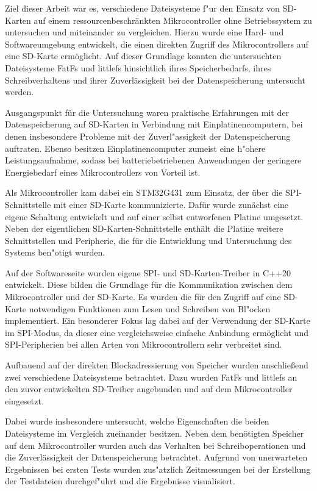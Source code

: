 \documentclass[11pt]{article}
\begin{document}
Ziel dieser Arbeit war es, verschiedene Dateisysteme f"ur den Einsatz 
von SD-Karten auf einem ressourcenbeschränkten Mikrocontroller ohne Betriebssystem zu untersuchen 
und miteinander zu vergleichen. 
Hierzu wurde eine Hard- und Softwareumgebung entwickelt, 
die einen direkten Zugriff des Mikrocontrollers auf eine SD-Karte ermöglicht. 
Auf dieser Grundlage konnten die untersuchten Dateisysteme FatFs und littlefs hinsichtlich ihres Speicherbedarfs, 
ihres Schreibverhaltens und ihrer Zuverlässigkeit bei der Datenspeicherung untersucht werden.

Ausgangspunkt für die Untersuchung waren praktische Erfahrungen mit der Datenspeicherung
auf SD-Karten in Verbindung mit Einplatinencomputern, 
bei denen insbesondere Probleme mit der Zuverl"assigkeit der Datenspeicherung auftraten.
Ebenso besitzen Einplatinencomputer zumeist eine h"ohere Leistungsaufnahme,
sodass bei batteriebetriebenen Anwendungen der geringere Energiebedarf 
eines Mikrocontrollers von Vorteil ist.

Als Mikrocontroller kam dabei ein STM32G431 zum Einsatz, der über die SPI-Schnittstelle mit einer SD-Karte kommunizierte.
Dafür wurde zunächst eine eigene Schaltung entwickelt und auf einer selbst entworfenen Platine umgesetzt.
Neben der eigentlichen SD-Karten-Schnittstelle enthält die Platine weitere Schnittstellen und Peripherie,
die für die Entwicklung und Untersuchung des Systems ben"otigt wurden.

Auf der Softwareseite wurden eigene SPI- und SD-Karten-Treiber in C++20 entwickelt. 
Diese bilden die Grundlage für die Kommunikation zwischen dem Mikrocontroller und der SD-Karte.
Es wurden die für den Zugriff auf eine SD-Karte notwendigen Funktionen zum Lesen und Schreiben
von Bl"ocken implementiert. 
Ein besonderer Fokus lag dabei auf der Verwendung der SD-Karte im SPI-Modus,
da dieser eine vergleichsweise einfache Anbindung ermöglicht und 
SPI-Peripherien bei allen Arten von Mikrocontrollern sehr verbreitet sind.

Aufbauend auf der direkten Blockadressierung von Speicher wurden anschließend zwei verschiedene Dateisysteme betrachtet. 
Dazu wurden FatFs und littlefs an den zuvor entwickelten SD-Treiber angebunden und auf dem Mikrocontroller eingesetzt.
 
Dabei wurde insbesondere untersucht, welche Eigenschaften die beiden Dateisysteme im Vergleich zueinander besitzen.
Neben dem benötigten Speicher auf dem Mikrocontroller wurden auch das Verhalten bei Schreiboperationen
und die Zuverlässigkeit der Datenspeicherung betrachtet.
Aufgrund von unerwarteten Ergebnissen bei ersten Tests wurden zus"atzlich
Zeitmessungen bei der Erstellung der Testdateien durchgef"uhrt und die Ergebnisse visualisiert. 
\end{document}
